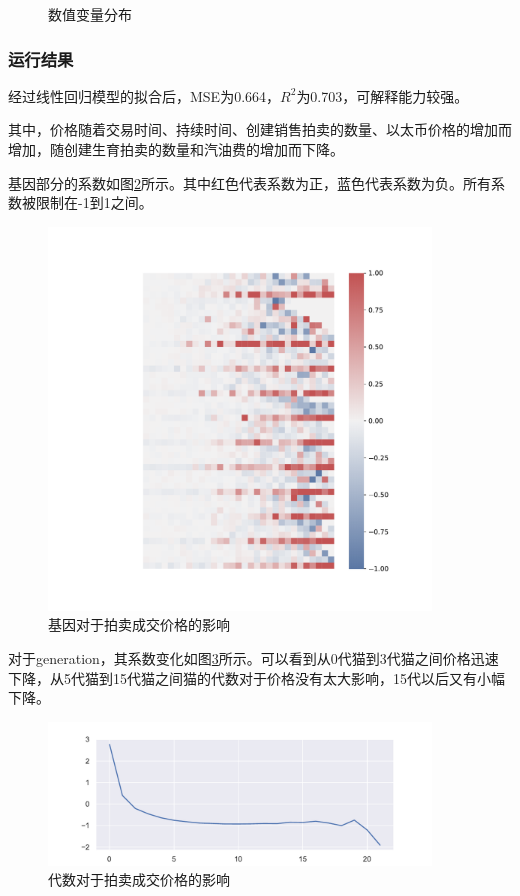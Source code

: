 \documentclass{myreport}
\begin{document}
\begin{figure}[!h]
	\caption{数值变量分布}
	\label{fig:variable distribution}
\end{figure}



\subsubsection{运行结果}
经过线性回归模型的拟合后，MSE为0.664，$R^2$为0.703，可解释能力较强。

其中，价格随着交易时间、持续时间、创建销售拍卖的数量、以太币价格的增加而增加，随创建生育拍卖的数量和汽油费的增加而下降。

基因部分的系数如图\ref{fig:gene coef}所示。其中红色代表系数为正，蓝色代表系数为负。所有系数被限制在-1到1之间。

\begin{figure}[!htbp]
	\centering
	\includegraphics[width=4in]{figure/gene coef.pdf}
	\caption{基因对于拍卖成交价格的影响}
	\label{fig:gene coef}
\end{figure}

对于generation，其系数变化如图\ref{fig:generation coef}所示。可以看到从0代猫到3代猫之间价格迅速下降，从5代猫到15代猫之间猫的代数对于价格没有太大影响，15代以后又有小幅下降。

\begin{figure}[!htbp]
	\centering
	\includegraphics[width=4in]{figure/generation coef.pdf}
	\caption{代数对于拍卖成交价格的影响}
	\label{fig:generation coef}
\end{figure}
\end{document}
